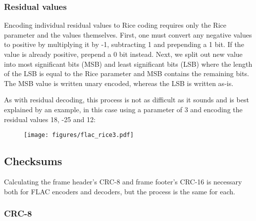 \subsubsection{Residual values}


Encoding individual residual values to Rice coding requires only
the Rice parameter and the values themselves.
First, one must convert any negative values to positive by
multiplying it by -1, subtracting 1 and prepending a 1 bit.
If the value is already positive, prepend a 0 bit instead.
Next, we split out new value into most significant bits (MSB) and
least significant bits (LSB) where the length of the LSB is
equal to the Rice parameter and MSB contains the remaining bits.
The MSB value is written unary encoded, whereas the LSB is written as-is.

As with residual decoding, this process is not as difficult as it
sounds and is best explained by an example, in this case using
a parameter of 3 and encoding the residual values 18, -25 and 12:
\begin{figure}[h]
\texttt{[image: figures/flac\_rice3.pdf]}
\end{figure}

\pagebreak

\subsection{Checksums}

Calculating the frame header's CRC-8 and frame footer's CRC-16 is necessary
both for FLAC encoders and decoders, but the process is the same for each.

\subsubsection{CRC-8}

